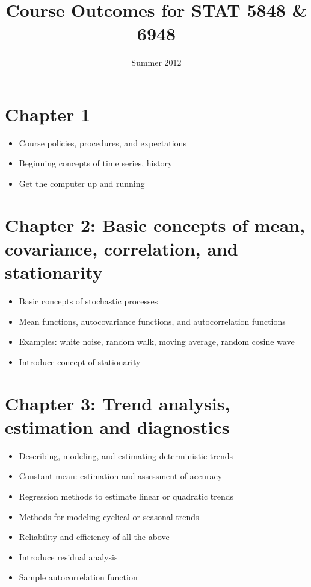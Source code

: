 \documentclass[12pt]{article}
\title{\vspace{-0.5in}Course Outcomes for STAT 5848 \& 6948}
\date{\vspace{-0.5in}Summer 2012}
\begin{document}
\maketitle


\section*{Chapter 1}
\label{sec-1}

\begin{itemize}
\item Course policies, procedures, and expectations
\item Beginning concepts of time series, history
\item Get the computer up and running
\end{itemize}
\section*{Chapter 2: Basic concepts of mean, covariance, correlation, and stationarity}
\label{sec-2}

\begin{itemize}
\item Basic concepts of stochastic processes
\item Mean functions, autocovariance functions, and autocorrelation functions
\item Examples: white noise, random walk, moving average, random cosine wave
\item Introduce concept of stationarity
\end{itemize}
\section*{Chapter 3: Trend analysis, estimation and diagnostics}
\label{sec-3}

\begin{itemize}
\item Describing, modeling, and estimating deterministic trends
\item Constant mean: estimation and assessment of accuracy
\item Regression methods to estimate linear or quadratic trends
\item Methods for modeling cyclical or seasonal trends
\item Reliability and efficiency of all the above
\item Introduce residual analysis
\item Sample autocorrelation function
\end{itemize}
\end{document}
